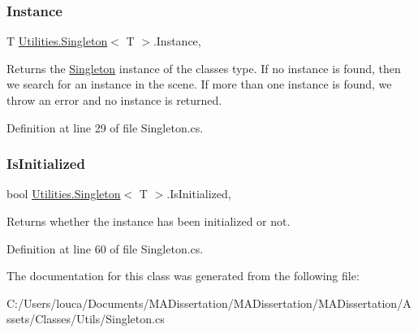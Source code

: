 \subsubsection{\texorpdfstring{Instance}{Instance}}
{\footnotesize\ttfamily T \mbox{\hyperlink{class_utilities_1_1_singleton}{Utilities.\+Singleton}}$<$ T $>$.Instance\hspace{0.3cm}{\ttfamily [static]}, {\ttfamily [get]}}



Returns the \mbox{\hyperlink{class_utilities_1_1_singleton}{Singleton}} instance of the classes type. If no instance is found, then we search for an instance in the scene. If more than one instance is found, we throw an error and no instance is returned. 



Definition at line 29 of file Singleton.\+cs.

\mbox{\label{class_utilities_1_1_singleton_ae3d28b0d6fbd2091235b2b2cd17a4c9a}} 
\subsubsection{\texorpdfstring{Is\+Initialized}{IsInitialized}}
{\footnotesize\ttfamily bool \mbox{\hyperlink{class_utilities_1_1_singleton}{Utilities.\+Singleton}}$<$ T $>$.Is\+Initialized\hspace{0.3cm}{\ttfamily [static]}, {\ttfamily [get]}}



Returns whether the instance has been initialized or not. 



Definition at line 60 of file Singleton.\+cs.



The documentation for this class was generated from the following file\+:\begin{DoxyCompactItemize}
\item 
C\+:/\+Users/louca/\+Documents/\+M\+A\+Dissertation/\+M\+A\+Dissertation/\+M\+A\+Dissertation/\+Assets/\+Classes/\+Utils/Singleton.\+cs\end{DoxyCompactItemize}
